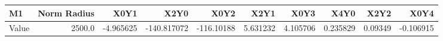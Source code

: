 \documentclass[convert={convertexe={magick.exe}, density={300}}]{standalone}
\begin{document}
\begin{tabular}{lrrrrrrrrr}
\toprule
\bf{M1} &  Norm Radius &      X0Y1 &        X2Y0 &       X0Y2 &      X2Y1 &      X0Y3 &      X4Y0 &     X2Y2 &      X0Y4 \\
\midrule
Value &       2500.0 & -4.965625 & -140.817072 & -116.10188 &  5.631232 &  4.105706 &  0.235829 &  0.09349 & -0.106915 \\
\bottomrule
\end{tabular}
\end{document}
